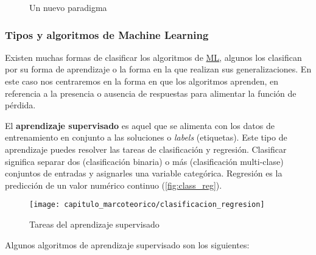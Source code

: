 \begin{figure}[H]
    
\caption{Un nuevo paradigma}
\label{fig:paradigma}
\end{figure}

\subsubsection{Tipos y algoritmos de Machine Learning}

Existen muchas formas de clasificar los algoritmos de \hyperlink{abbr}{ML},
algunos los clasifican por su forma de aprendizaje o la forma en la que realizan
sus generalizaciones. En este caso nos centraremos en la forma en que los
algoritmos aprenden, en referencia a la presencia o ausencia de respuestas para
alimentar la función de pérdida\cite{AurelienGeron2017}.

El \textbf{aprendizaje supervisado} es aquel que se alimenta con los datos de
entrenamiento en conjunto a las soluciones o \emph{labels} (etiquetas). Este
tipo de aprendizaje puedes resolver las tareas de clasificación y regresión.
Clasificar significa separar dos (clasificación binaria) o más (clasificación
multi-clase) conjuntos de entradas y asignarles una variable categórica.
Regresión es la predicción de un valor numérico continuo
(\autoref{fig:class_reg}).

\begin{figure}[H]
    \centering
    \texttt{[image: capitulo\_marcoteorico/clasificacion\_regresion]}
    \caption{Tareas del aprendizaje supervisado}\label{fig:class_reg}
\end{figure}

Algunos algoritmos de aprendizaje supervisado son los siguientes:

